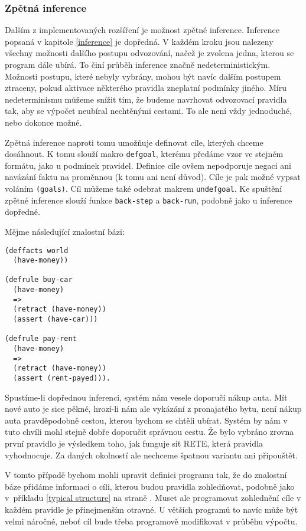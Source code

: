 \subsubsection{Zpětná inference}
\label{backward inference}

Dalším z implementovaných rozšíření je možnost zpětné inference. Inference
popsaná v kapitole \ref{inference} je dopředná. V každém kroku jsou nalezeny
všechny možnosti dalšího postupu odvozování, načež je zvolena jedna, kterou se
program dále ubírá. To činí průběh inference značně nedeterministickým. Možnosti
postupu, které nebyly vybrány, mohou být navíc dalším postupem ztraceny, pokud
aktivace některého pravidla zneplatní podmínky jiného.
Míru nedeterminismu můžeme snížit tím, že budeme navrhovat odvozovací pravidla
tak, aby se výpočet neubíral nechtěnými cestami. To ale není vždy jednoduché,
nebo dokonce možné.

Zpětná inference naproti tomu umožňuje definovat cíle, kterých chceme dosáhnout.
K tomu slouží makro \verb|defgoal|, kterému předáme vzor ve stejném formátu,
jako u podmínek pravidel. Definice cíle ovšem nepodporuje negaci ani navázání
faktu na proměnnou (k tomu ani není důvod). Cíle je pak možné vypsat voláním
\verb|(goals)|. Cíl můžeme také odebrat makrem \verb|undefgoal|.
Ke spuštění zpětné inference slouží funkce \verb|back-step| a
\verb|back-run|, podobně jako u inference dopředné.

Mějme následující znalostní bázi:
\begin{verbatim}
(deffacts world
  (have-money))

(defrule buy-car
  (have-money)
  =>
  (retract (have-money))
  (assert (have-car)))

(defrule pay-rent
  (have-money)
  =>
  (retract (have-money))
  (assert (rent-payed))).
\end{verbatim}
Spustíme-li dopřednou inferenci, systém nám vesele doporučí nákup auta.
Mít nové auto je sice pěkné, hrozí-li nám ale vykázání z pronajatého bytu,
není nákup auta pravděpodobně cestou, kterou bychom se chtěli ubírat.
Systém by nám v tuto chvíli mohl stejně dobře doporučit správnou cestu. Že bylo
vybráno zrovna první pravidlo je výsledkem toho, jak funguje síť RETE, která
pravidla vyhodnocuje. Za daných okolností ale nechceme špatnou variantu ani
připouštět.

V tomto případě bychom mohli upravit definici programu tak, že do znalostní báze
přidáme informaci o cíli, kterou budou pravidla zohledňovat, podobně jako
v~příkladu \ref{typical structure} na straně \pageref{typical structure}. Muset
ale programovat zohlednění cíle v každém pravidle je přinejmenším otravné. U
větších programů to navíc může být velmi náročné, neboť cíl bude třeba
programově modifikovat v průběhu výpočtu.

